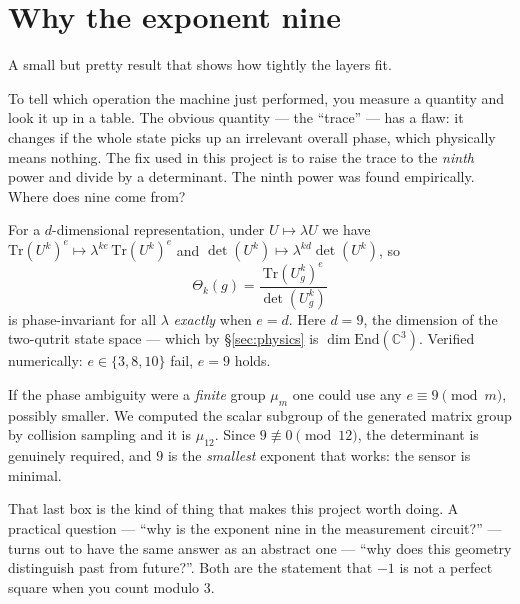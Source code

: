 \section{Why the exponent nine}

\begin{plain}
A small but pretty result that shows how tightly the layers fit.

To tell which operation the machine just performed, you measure a quantity and look it up
in a table. The obvious quantity --- the ``trace'' --- has a flaw: it changes if the whole
state picks up an irrelevant overall phase, which physically means nothing. The fix used
in this project is to raise the trace to the \emph{ninth} power and divide by a
determinant. The ninth power was found empirically. Where does nine come from?
\end{plain}

\begin{spec}
For a $d$-dimensional representation, under $U\mapsto\lambda U$ we have
$\mathrm{Tr}(U^k)^e\mapsto\lambda^{ke}\,\mathrm{Tr}(U^k)^e$ and
$\det(U^k)\mapsto\lambda^{kd}\det(U^k)$, so
\[
  \Theta_k(g)=\frac{\mathrm{Tr}(U_g^k)^e}{\det(U_g^k)}
\]
is phase-invariant for all $\lambda$ \emph{exactly} when $e=d$. Here $d=9$, the dimension
of the two-qutrit state space --- which by \S\ref{sec:physics} is
$\dim\mathrm{End}(\mathbb{C}^3)$. Verified numerically: $e\in\{3,8,10\}$ fail, $e=9$ holds.

\smallskip\noindent
If the phase ambiguity were a \emph{finite} group $\mu_m$ one could use any
$e\equiv 9\pmod m$, possibly smaller. We computed the scalar subgroup of the generated
matrix group by collision sampling and it is $\mu_{12}$. Since $9\not\equiv 0\pmod{12}$,
the determinant is genuinely required, and $9$ is the \emph{smallest} exponent that
works: the sensor is minimal.
\end{spec}


\begin{plain}
That last box is the kind of thing that makes this project worth doing. A practical
question --- ``why is the exponent nine in the measurement circuit?'' --- turns out to
have the same answer as an abstract one --- ``why does this geometry distinguish past
from future?''. Both are the statement that $-1$ is not a perfect square when you count
modulo $3$.
\end{plain}

